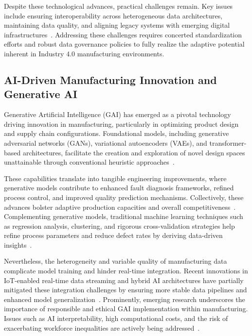 \documentclass[sigconf]{acmart}
\begin{document}
Despite these technological advances, practical challenges remain. Key issues include ensuring interoperability across heterogeneous data architectures, maintaining data quality, and aligning legacy systems with emerging digital infrastructures~\cite{ref42}. Addressing these challenges requires concerted standardization efforts and robust data governance policies to fully realize the adaptive potential inherent in Industry 4.0 manufacturing environments.

\subsection{AI-Driven Manufacturing Innovation and Generative AI}

Generative Artificial Intelligence (GAI) has emerged as a pivotal technology driving innovation in manufacturing, particularly in optimizing product design and supply chain configurations. Foundational models, including generative adversarial networks (GANs), variational autoencoders (VAEs), and transformer-based architectures, facilitate the creation and exploration of novel design spaces unattainable through conventional heuristic approaches~\cite{ref1,ref8}.  

These capabilities translate into tangible engineering improvements, where generative models contribute to enhanced fault diagnosis frameworks, refined process control, and improved quality prediction mechanisms. Collectively, these advances bolster adaptive production capacities and overall competitiveness~\cite{ref7,ref9,ref36}. Complementing generative models, traditional machine learning techniques such as regression analysis, clustering, and rigorous cross-validation strategies help refine process parameters and reduce defect rates by deriving data-driven insights~\cite{ref10,ref13}.  

Nevertheless, the heterogeneity and variable quality of manufacturing data complicate model training and hinder real-time integration. Recent innovations in IoT-enabled real-time data streaming and hybrid AI architectures have partially mitigated these integration challenges by ensuring more stable data pipelines and enhanced model generalization~\cite{ref20,ref29}. Prominently, emerging research underscores the importance of responsible and ethical GAI implementation within manufacturing. Issues such as AI interpretability, high computational costs, and the risk of exacerbating workforce inequalities are actively being addressed~\cite{ref43}.  
\end{document}
